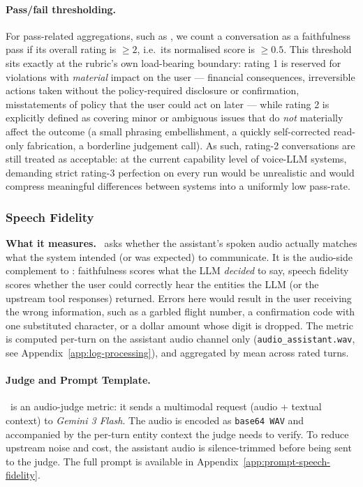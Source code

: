\paragraph{Pass/fail thresholding.} For pass-related aggregations, such as \passatk, we count a conversation as a faithfulness pass if its overall rating is $\geq 2$, i.e.\ its normalised score is $\geq 0.5$. This threshold sits exactly at the rubric's own load-bearing boundary: rating 1 is reserved for violations with \emph{material} impact on the user --- financial consequences, irreversible actions taken without the policy-required disclosure or confirmation, misstatements of policy that the user could act on later --- while rating 2 is explicitly defined as covering minor or ambiguous issues that do \emph{not} materially affect the outcome (a small phrasing embellishment, a quickly self-corrected read-only fabrication, a borderline judgement call). As such, rating-2 conversations are still treated as acceptable: at the current capability level of voice-LLM systems, demanding strict rating-3 perfection on every run would be unrealistic and would compress meaningful differences between systems into a uniformly low pass-rate.

\subsubsection{Speech Fidelity}
\label{app:metric-speech-fidelity}

\textbf{What it measures.} \metricfidelity~asks whether the assistant's spoken audio actually matches what the system intended (or was expected) to communicate. It is the audio-side complement to \metricfaithfulness: faithfulness scores what the LLM \emph{decided} to say, speech fidelity scores whether the user could correctly hear the entities the LLM (or the upstream tool responses) returned. Errors here would result in the user receiving the wrong information, such as a garbled flight number, a confirmation code with one substituted character, or a dollar amount whose digit is dropped. The metric is computed per-turn on the assistant audio channel only (\texttt{audio\_assistant.wav}, see Appendix~\ref{app:log-processing}), and aggregated by mean across rated turns.

\paragraph{Judge and Prompt Template.} \metricfidelity~is an audio-judge metric: it sends a multimodal request (audio + textual context) to \emph{Gemini 3 Flash}. The audio is encoded as \texttt{base64 WAV} and accompanied by the per-turn entity context the judge needs to verify. To reduce upstream noise and cost, the assistant audio is silence-trimmed before being sent to the judge. The full prompt is available in Appendix~\ref{app:prompt-speech-fidelity}.

